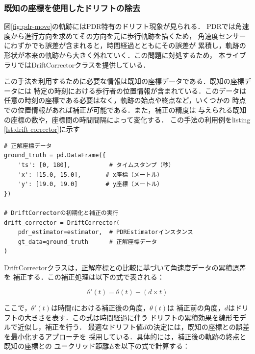 \subsubsection{既知の座標を使用したドリフトの除去}

図\ref{fig:pdr-move}の軌跡にはPDR特有のドリフト現象が見られる．
PDRでは角速度から進行方向を求めてその方向を元に歩行軌跡を描くため，
角速度センサーにわずかでも誤差が含まれると，時間経過とともにその誤差が
累積し，軌跡の形状が本来の軌跡から大きく外れていく．この問題に対処するため，
本ライブラリではDriftCorrectorクラスを提供している．

この手法を利用するために必要な情報は既知の座標データである．既知の座標データには
特定の時刻における歩行者の位置情報が含まれている．このデータは
任意の時刻の座標である必要はなく，軌跡の始点や終点など，いくつかの
時点での位置情報があれば補正が可能である．また，補正の精度は
与えられる既知の座標の数や，座標間の時間間隔によって変化する．
この手法の利用例をlisting \ref{lst:drift-corrector}に示す


\begin{lstlisting}[caption={DriftCorrector},label=lst:drift-corrector,float=h]
# 正解座標データ
ground_truth = pd.DataFrame({
    'ts': [0, 180],           # タイムスタンプ（秒）
    'x': [15.0, 15.0],       # x座標（メートル）
    'y': [19.0, 19.0]        # y座標（メートル）
})

# DriftCorrectorの初期化と補正の実行
drift_corrector = DriftCorrector(
    pdr_estimator=estimator,  # PDREstimatorインスタンス
    gt_data=ground_truth      # 正解座標データ
)
\end{lstlisting}



DriftCorrectorクラスは，正解座標との比較に基づいて角速度データの累積誤差を
補正する．この補正処理は以下の式で表される：

\begin{equation}
    \theta'(t) = \theta(t) - (d \times t)
\end{equation}

ここで，$\theta'(t)$は時間$t$における補正後の角度，$\theta(t)$は
補正前の角度，$d$はドリフトの大きさを表す．この式は時間経過に伴う
ドリフトの累積効果を線形モデルで近似し，補正を行う．
最適なドリフト値$d$の決定には，既知の座標との誤差を最小化するアプローチを
採用している．具体的には，補正後の軌跡の終点と既知の座標との
ユークリッド距離$E$を以下の式で計算する：

